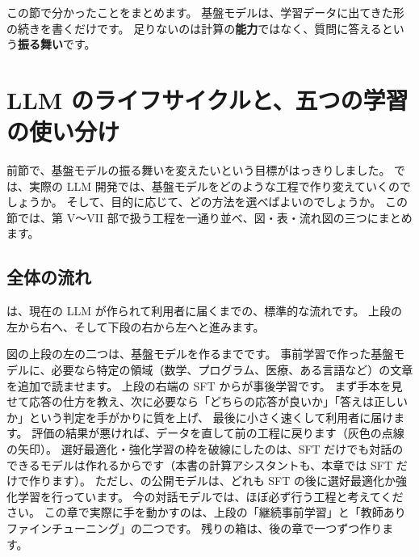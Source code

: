 この節で分かったことをまとめます。
基盤モデルは、学習データに出てきた形の続きを書くだけです。
足りないのは計算の\textbf{能力}ではなく、質問に答えるという\textbf{振る舞い}です。

\section{LLM のライフサイクルと、五つの学習の使い分け}\label{sec:post-lifecycle}

前節で、基盤モデルの振る舞いを変えたいという目標がはっきりしました。
では、実際の LLM 開発では、基盤モデルをどのような工程で作り変えていくのでしょうか。
そして、目的に応じて、どの方法を選べばよいのでしょうか。
この節では、第 V〜VII 部で扱う工程を一通り並べ、図・表・流れ図の三つにまとめます。

\subsection{全体の流れ}

は、現在の LLM が作られて利用者に届くまでの、標準的な流れです。
上段の左から右へ、そして下段の右から左へと進みます。

図の上段の左の二つは、基盤モデルを作るまでです。
事前学習で作った基盤モデルに、必要なら特定の領域（数学、プログラム、医療、ある言語など）の文章を追加で読ませます。
上段の右端の SFT からが事後学習です。
まず手本を見せて応答の仕方を教え、次に必要なら「どちらの応答が良いか」「答えは正しいか」という判定を手がかりに質を上げ、
最後に小さく速くして利用者に届けます。
評価の結果が悪ければ、データを直して前の工程に戻ります（灰色の点線の矢印）。
選好最適化・強化学習の枠を破線にしたのは、SFT だけでも対話のできるモデルは作れるからです（本書の計算アシスタントも、本章では SFT だけで作ります）。
ただし、の公開モデルは、どれも SFT の後に選好最適化か強化学習を行っています。
今の対話モデルでは、ほぼ必ず行う工程と考えてください。
この章で実際に手を動かすのは、上段の「継続事前学習」と「教師ありファインチューニング」の二つです。
残りの箱は、後の章で一つずつ作ります。

